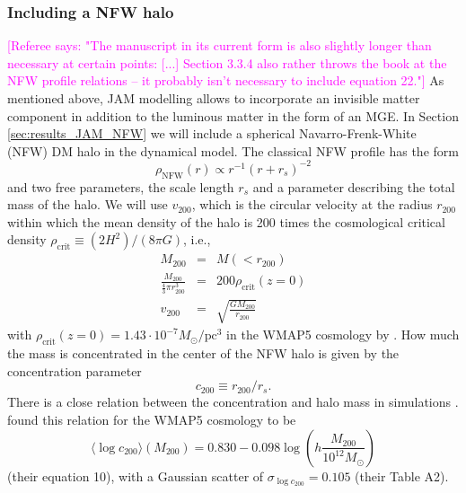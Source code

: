 \documentclass[useAMS,usenatbib]{mnras}
\newcommand{\Wilma}[1]{\textcolor{Magenta}{#1}}
\begin{document}
\subsubsection{Including a NFW halo} \label{sec:model_JAM_NFW}

\Wilma{[Referee says: "The manuscript in its current form is also slightly longer than necessary at certain
points: [...] Section 3.3.4
also rather throws the book at the NFW profile relations – it probably isn't
necessary to include equation 22."]}
As mentioned above, JAM modelling allows to incorporate an invisible matter component in addition to the luminous matter in the form of an MGE. In Section \ref{sec:results_JAM_NFW} we will include a spherical Navarro-Frenk-White (NFW) DM halo \citep{1996ApJ...462..563N} in the dynamical model. The classical NFW profile has the form
\begin{equation}
\rho_\text{NFW}(r) \propto r^{-1} \left( r+r_s \right)^{-2} \label{eq:NFWprofile}
\end{equation}
and two free parameters, the scale length $r_s$ and a parameter describing the total mass of the halo. We will use $v_\text{200}$, which is the circular velocity at the radius $r_\text{200}$ within which the mean density of the halo is 200 times the cosmological critical density $\rho_\text{crit} \equiv (2H^2)/(8\pi G)$, i.e.,
\begin{eqnarray*}
M_\text{200} &=& M(<r_{200})\\
\frac{M_{200}}{ \frac 43 \pi r_{200}^3} &=& 200 \rho_\text{crit}(z=0) \\
v_\text{200} &=& \sqrt{\frac{GM_{200}}{r_\text{200}}}
\end{eqnarray*}
with $\rho_\text{crit}(z=0)=1.43 \cdot 10^{-7} M_\odot / \text{pc}^3$ in the WMAP5 cosmology by \citet{WMAP5cosm}. How much the mass is concentrated in the center of the NFW halo is given by the concentration parameter
\begin{equation}
c_{200}\equiv r_{200} / r_s. \label{eq:NFW_c}
\end{equation} 
There is a close relation between the concentration and halo mass in simulations \citep{1996ApJ...462..563N}. \citet{Maccio08} found this relation for the WMAP5 cosmology to be
\begin{equation}
\langle \log c_{200} \rangle (M_{200}) = 0.830 - 0.098 \log \left(h \frac{M_{200}}{10^{12} M_\odot} \right) \label{eq:Maccio08}
\end{equation}
(their equation 10), with a Gaussian scatter of $\sigma_{\log c_{200}} = 0.105$ (their Table A2). 
\end{document}
